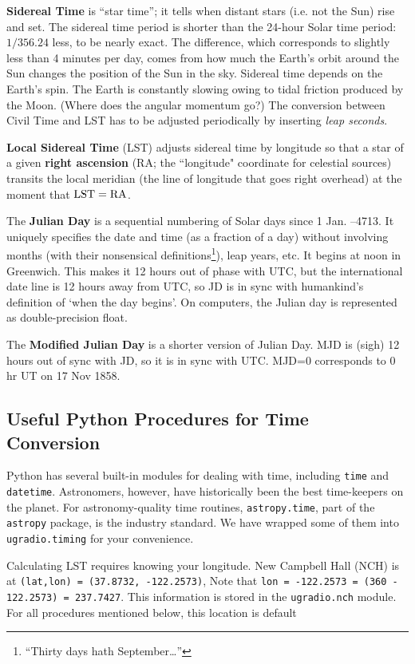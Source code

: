 \documentclass[11pt,preprint]{aastex}
\begin{document}
{\bf Sidereal Time} is ``star time''; it tells when
distant stars (i.e. not the Sun) rise and set. The sidereal time period is
shorter than the 24-hour Solar time period: $1/356.24$ less, to
be nearly exact. The difference, which corresponds to slightly 
less than 4 minutes per day, comes from how much the Earth's orbit around the
Sun changes the position of the Sun in the sky.
Sidereal time depends on the Earth's spin. The
Earth is constantly slowing owing to tidal friction produced by the
Moon. (Where does the angular momentum go?) The conversion between Civil Time and LST has to be adjusted
periodically by inserting {\it leap seconds}.

{\bf Local Sidereal Time} (LST)
adjusts sidereal time by longitude so that a star of a given {\bf right ascension} 
(RA; the ``longitude" coordinate for celestial sources) transits the local meridian
(the line of longitude that goes right overhead) at the moment
that ${\rm LST}={\rm RA}$. 

The {\bf Julian Day} is a sequential numbering of Solar days since 1 Jan. --4713. 
It
uniquely specifies the date and time (as a fraction of a day) without 
involving 
months (with their nonsensical definitions\footnote{``Thirty days
  hath September\dots''}), leap years, etc. It begins at noon 
in Greenwich. This makes it 12 hours out of phase with UTC, but the
international date line is 12 hours away from UTC, so JD is in sync
with humankind's definition of `when the day begins'. 
On computers, the Julian day is represented as double-precision
float.

The {\bf Modified Julian Day} is a shorter version of Julian Day. MJD is (sigh) 12
hours out of sync with JD, so it is in sync with UTC.
MJD=0 corresponds to 0 hr UT on 17 Nov 1858.

\subsection{ Useful Python Procedures for Time Conversion}

\noindent
Python has several built-in modules for dealing with time, including {\tt time} 
and {\tt datetime}.
Astronomers, however, have historically been the best time-keepers on the planet.  For
astronomy-quality time routines, {\tt astropy.time}, part of the {\tt astropy} package, is
the industry standard.  We have wrapped some of them into {\tt ugradio.timing} for
your convenience.

Calculating LST requires knowing your
longitude. New Campbell Hall (NCH) is at 
{\tt (lat,lon) = (37.8732, -122.2573)},  Note that {\tt lon = -122.2573 = (360 - 122.2573) = 237.7427}. 
This information is stored in the {\tt ugradio.nch} module.
For all procedures mentioned below, this location is default
\end{document}
